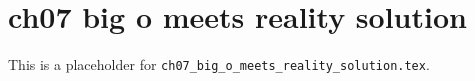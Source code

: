 \chapter{ch07 big o meets reality solution}
\label{ch07_big_o_meets_reality_solution}

This is a placeholder for \texttt{ch07_big_o_meets_reality_solution.tex}.


